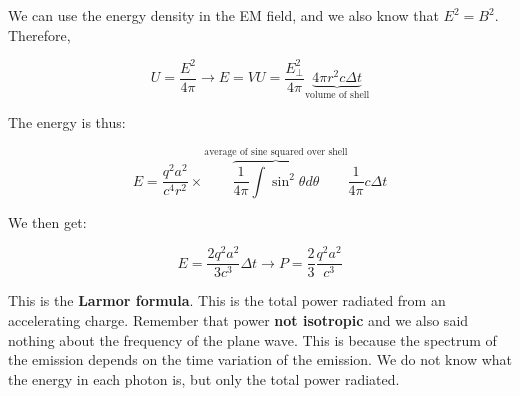 \documentclass{article}
\begin{document}
We can use the energy density in the EM field, and we also know that $E^2 = B^2$. Therefore, 

\begin{equation}
    U = \frac{E^2}{ 4 \pi} \rightarrow E = VU = \frac{E_\perp^2}{4\pi} \underbrace{4\pi r^2 c\Delta t}_{\text{volume of shell}}
\end{equation}

The energy is thus:

\begin{equation}
    E = \frac{q^2 a^2}{c^4 r^2} \times \overbrace{\frac{1}{4\pi} \int \sin^2{\theta} d\theta}^{\text{average of sine squared over shell}} \frac{1}{4\pi} c\Delta t
\end{equation}

We then get:

\begin{equation}
    E = \frac{2q^2 a^2}{3c^3} \Delta t \rightarrow \boxed{P = \frac{2}{3} \frac{q^2 a^2}{c^3}}
\end{equation}

This is the \textbf{Larmor formula}. This is the total power radiated from an accelerating charge. Remember that power \textbf{not isotropic} and we also said nothing about the frequency of the plane wave. This is because the spectrum of the emission depends on the time variation of the emission. We do not know what the energy in each photon is, but only the total power radiated. 
\end{document}
